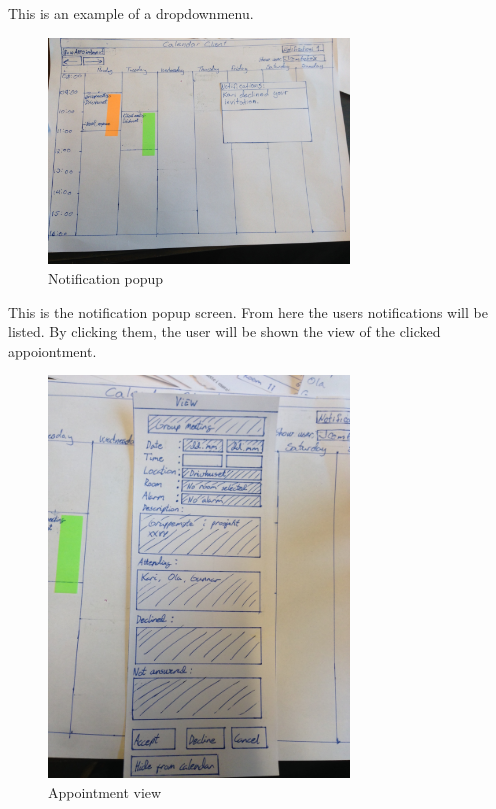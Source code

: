 \documentclass{article}
\begin{document}
This is an example of a dropdownmenu.

\newpage

\begin{figure}[h!] 
    \begin{center} 
        \includegraphics[width=8cm]{img/IMG_5608.JPG}
        \caption{Notification popup}
    \label{notificationpopup}
    \end{center}
\end{figure}

This is the notification popup screen. From here the users notifications will be listed. By clicking them, the user will be shown the view of the clicked appoiontment.

\newpage


\begin{figure}[h!] 
    \begin{center} 
        \includegraphics[width=8cm]{img/IMG_5609.JPG}
        \caption{Appointment view}
    \label{appointmentview}
    \end{center}
\end{figure}
\end{document}
